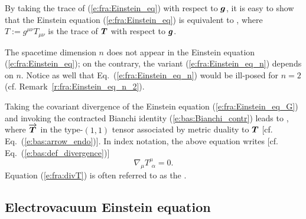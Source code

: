 By taking the trace of (\ref{e:fra:Einstein_eq}) with respect to $\bm{g}$, it is
easy to show that the Einstein equation (\ref{e:fra:Einstein_eq}) is
equivalent to
\be \label{e:fra:Einstein_eq_n}
    ,
\ee
where $T := g^{\mu\nu} T_{\mu\nu}$ is the trace of $\bm{T}$ with respect to
$\bm{g}$.

\begin{remark}
The spacetime dimension $n$ does not appear in the Einstein equation
(\ref{e:fra:Einstein_eq}); on the contrary, the variant
(\ref{e:fra:Einstein_eq_n}) depends on $n$. Notice as well that
Eq.~(\ref{e:fra:Einstein_eq_n}) would be ill-posed for $n=2$
(cf. Remark~\ref{r:fra:Einstein_eq_n_2}).
\end{remark}

Taking the covariant divergence of the Einstein equation (\ref{e:fra:Einstein_eq_G})
and invoking the contracted Bianchi identity (\ref{e:bas:Bianchi_contr}) leads
to
\be \label{e:fra:divT}
    ,
\ee
where $\overrightarrow{\bm{T}}$ in the type-$(1,1)$ tensor associated by metric duality
to $\bm{T}$ [cf. Eq.~(\ref{e:bas:arrow_endo})]. In index notation, the above
equation writes [cf. Eq.~(\ref{e:bas:def_divergence})]
\[
    \nabla_\mu T^\mu_{\ \, \alpha} = 0 .
\]
Equation (\ref{e:fra:divT}) is often referred to as the .

\subsection{Electrovacuum Einstein equation} \label{e:fra:electrovacuum}

